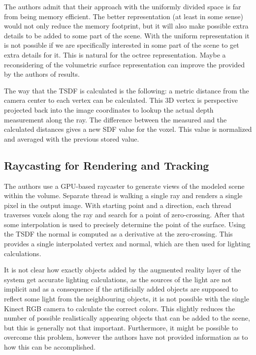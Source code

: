\documentclass[12pt]{article}
\theoremstyle{plain}
\begin{document}
    The authors admit that their approach with the uniformly divided space is
    far from being memory efficient. The better representation (at least in some
    sense) would not only reduce the memory footprint, but it will also make
    possible extra details to be added to some part of the scene. With the
    uniform representation it is not possible if we are specifically interested
    in some part of the scene to get extra details for it. This is natural for
    the octree representation. Maybe a reconsidering of the volumetric surface
    representation can improve the provided by the authors of
    \cite{kinectfusion} results.

    The way that the TSDF is calculated is the following: a metric distance from
    the camera center to each vertex can be calculated. This 3D vertex is
    perspective projected back into the image coordinates to lookup the actual
    depth measurement along the ray. The difference between the measured and the
    calculated distances gives a new SDF value for the voxel. This value is
    normalized and averaged with the previous stored value. 

  \subsection{Raycasting for Rendering and Tracking} %
  \label{sub:Raycasting for Rendering and Tracking}
    The authors use a GPU-based raycaster to generate views of the modeled scene
    within the volume. Separate thread is walking a single ray and renders a
    single pixel in the output image. With starting point and a direction, each
    thread traverses voxels along the ray and search for a point of
    zero-crossing. After that some interpolation is used to precisely determine
    the point of the surface. Using the TSDF the normal is computed as a
    derivative at the zero-crossing. This provides a single interpolated vertex
    and normal, which are then used for lighting calculations.

    It is not clear how exactly objects added by the augmented reality layer of
    the system get accurate lighting calculations, as the sources of the light
    are not implicit and as a consequence if the artificially added objects are
    supposed to reflect some light from the neighbouring objects, it is not
    possible with the single Kinect RGB camera to calculate the correct colors.
    This slightly reduces the number of possible realistically appearing objects
    that can be added to the scene, but this is generally not that important.
    Furthermore, it might be possible to overcome this problem, however the
    authors have not provided information as to how this can be accomplished.
\end{document}
